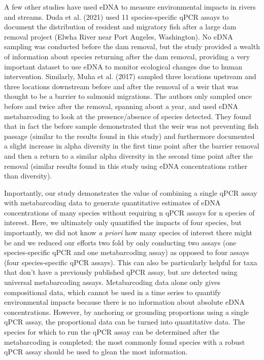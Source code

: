 \documentclass[
]{article}
\begin{document}
A few other studies have used eDNA to measure environmental impacts in
rivers and streams. Duda et al. (2021) used 11 species-specific qPCR
assays to document the distribution of resident and migratory fish after
a large dam removal project (Elwha River near Port Angeles, Washington).
No eDNA sampling was conducted before the dam removal, but the study
provided a wealth of information about species returning after the dam
removal, providing a very important dataset to use eDNA to monitor
ecological changes due to human intervention. Similarly, Muha et al.
(2017) sampled three locations upstream and three locations downstream
before and after the removal of a weir that was thought to be a barrier
to salmonid migrations. The authors only sampled once before and twice
after the removal, spanning about a year, and used eDNA metabarcoding to
look at the presence/absence of species detected. They found that in
fact the before sample demonstrated that the weir was not preventing
fish passage (similar to the results found in this study) and
furthermore documented a slight increase in alpha diversity in the first
time point after the barrier removal and then a return to a similar
alpha diversity in the second time point after the removal (similar
results found in this study using eDNA concentrations rather than
diversity).

Importantly, our study demonstrates the value of combining a single qPCR
assay with metabarcoding data to generate quantitative estimates of eDNA
concentrations of many species without requiring n qPCR assays for n
species of interest. Here, we ultimately only quantified the impacts of
four species, but importantly, we did not know \emph{a priori} how many
species of interest there might be and we reduced our efforts two fold
by only conducting two assays (one species-specific qPCR and one
metabarcoding assay) as opposed to four assays (four species-specific
qPCR assays). This can also be particularly helpful for taxa that don't
have a previously published qPCR assay, but are detected using universal
metabarcoding assays. Metabarcoding data alone only gives compositional
data, which cannot be used in a time series to quantify environmental
impacts because there is no information about absolute eDNA
concentrations. However, by anchoring or grounding proportions using a
single qPCR assay, the proportional data can be turned into quantitative
data. The species for which to run the qPCR assay can be determined
after the metabarcoding is completed; the most commonly found species
with a robust qPCR assay should be used to glean the most information.
\end{document}
